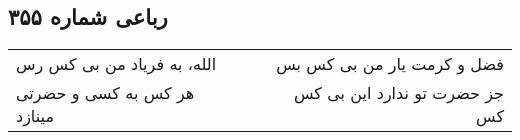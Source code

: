 \begin{center}
\section*{رباعی شماره ۳۵۵}
\label{sec:sh355}
\begin{longtable}{l p{0.5cm} r}
الله، به فریاد من بی کس رس
&&
فضل و کرمت یار من بی کس بس
\\
هر کس به کسی و حضرتی مینازد
&&
جز حضرت تو ندارد این بی کس کس
\\
\end{longtable}
\end{center}
